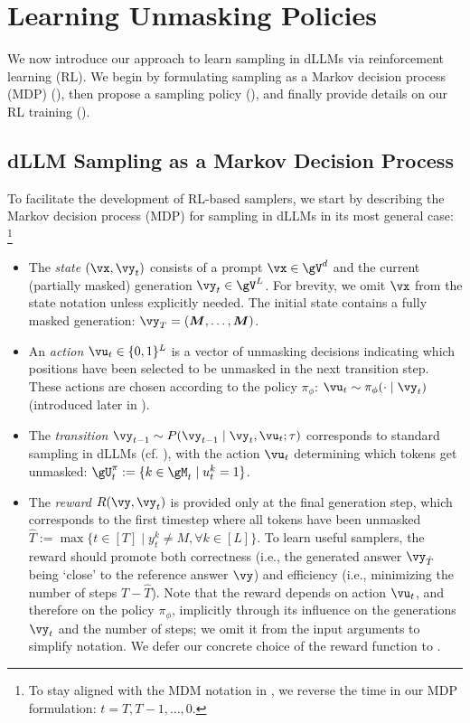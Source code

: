 \section{Learning Unmasking Policies}
We now introduce our approach to learn sampling in dLLMs via reinforcement learning (RL). We begin by formulating sampling as a Markov decision process (MDP) (), then propose a sampling policy (), and finally provide details on our RL training  ().

\subsection{dLLM Sampling as a Markov Decision Process}
\label{sec:methods_mdp}
To facilitate the development of RL-based samplers, we start by describing the Markov decision process (MDP) \citep{sutton1998reinforcement} for sampling in dLLMs in its most general case:
\footnote{To stay aligned with the MDM notation in , we reverse the time in our MDP formulation: $t = T, T-1, \ldots, 0$.}
\begin{itemize}

    \item The \emph{state} $(\vx, \vy_t)$  consists of a prompt $\vx \in \gV^d$ and the current (partially masked) generation $\vy_t \in \gV^L$. For brevity, we omit $\vx$ from the state notation unless explicitly needed. The initial state contains a fully masked generation: $\vy_T = (\mask, \ldots, \mask)$.
    
    \item An \emph{action} $\vu_t \in \{0, 1\}^L$ is a vector of unmasking decisions  indicating which positions have been selected to be unmasked in the next transition step. These actions are chosen according to the policy $\pi_\phi$: $\vu_t \sim \pi_{\phi}(\cdot \mid \vy_t)$ (introduced later in ).
    
    \item The \emph{transition} $\vy_{t-1} \sim P(\vy_{t-1} \mid \vy_t, \vu_t; \tau)$ corresponds to standard sampling in dLLMs (cf. ), with the action $\vu_t$ determining which tokens get unmasked: $\gU_t^{\pi} := \{k \in \gM_t \mid u_t^k = 1 \}$. %
    
    \item The \emph{reward} $R(\vy, \vy_t)$ is provided only at the final generation step, which corresponds to the first timestep where all tokens have been unmasked $\hat{T} := \max \{t \in [T] \mid y_t^k \neq M, \forall k \in [L] \}$. To learn useful samplers, the reward should promote both correctness (i.e., the generated answer $\vy_{\hat{T}}$ being `close' to the reference answer $\vy$) and efficiency (i.e., minimizing the number of steps $T - \hat{T}$). Note that the reward depends on action $\vu_t$, and therefore on the policy $\pi_\phi$, implicitly through its influence on the generations $\vy_t$ and the number of steps; we omit it from the input arguments to simplify notation. We defer our concrete choice of the reward function to .
    
\end{itemize}
